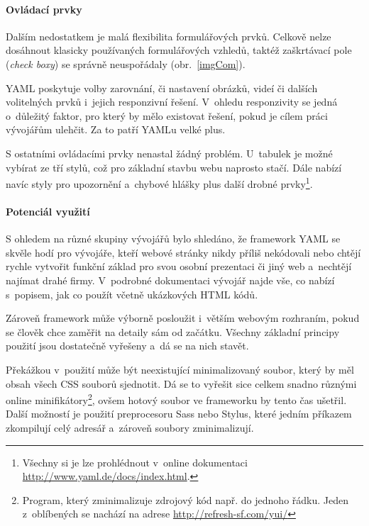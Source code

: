 \documentclass[thesis=B,czech]{FITthesis}[2012/06/26]
\begin{document}
\paragraph{Ovládací prvky}

Dalším nedostatkem je malá flexibilita formulářových prvků. Celkově nelze dosáhnout klasicky používaných formulářových vzhledů, taktéž zaškrtávací pole (\textit{check boxy}) se správně neuspořádaly (obr.~\ref{imgCom}). 

\gls{YAML} poskytuje volby zarovnání, či nastavení obrázků, videí či dalších volitelných prvků i~jejich responzivní řešení. V~ohledu responzivity se jedná o~důležitý faktor, pro který by mělo existovat řešení, pokud je cílem práci vývojářům ulehčit. Za to patří \gls{YAML}u velké plus.


S ostatními ovládacími prvky nenastal žádný problém. U~tabulek  je možné vybírat ze tří stylů, což pro základní stavbu webu naprosto stačí. Dále nabízí navíc styly pro upozornění a~chybové hlášky plus další drobné prvky\footnote{Všechny si je lze prohlédnout v~online dokumentaci \url{http://www.yaml.de/docs/index.html}.}. 

\paragraph{Potenciál využití}

S ohledem na různé skupiny vývojářů bylo shledáno, že framework \gls{YAML} se skvěle hodí pro vývojáře, kteří webové stránky nikdy příliš nekódovali nebo chtějí rychle vytvořit funkční základ pro svou osobní prezentaci či jiný web a~nechtějí najímat drahé firmy. V~podrobné dokumentaci vývojář najde vše, co nabízí s~popisem, jak co použít včetně ukázkových \gls{HTML} kódů.

Zároveň framework může výborně posloužit i~větším webovým rozhraním, pokud se člověk chce zaměřit na detaily sám od začátku. Všechny základní principy použití jsou dostatečně vyřešeny a~dá se na nich stavět. 

Překážkou v~použití může být neexistující minimalizovaný soubor, který by měl obsah  všech \gls{CSS} souborů sjednotit. Dá se to vyřešit sice celkem snadno různými online minifikátory\footnote{Program, který zminimalizuje zdrojový kód např. do jednoho řádku. Jeden z~oblíbených se nachází na adrese \url{http://refresh-sf.com/yui/}}, ovšem hotový soubor ve frameworku by tento čas ušetřil. Další možností je použití preprocesoru \gls{Sass} nebo Stylus, které jedním příkazem zkompilují celý adresář a~zároveň soubory zminimalizují.
\end{document}

